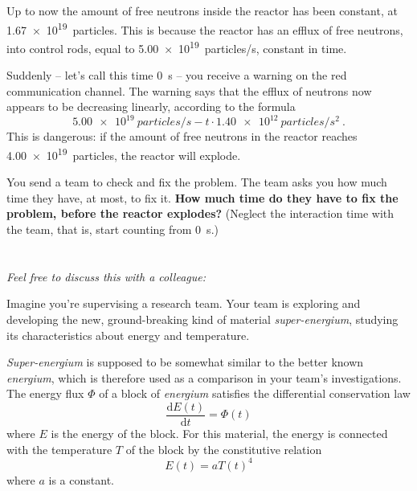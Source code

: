 \documentclass[a4paper,12pt,%
onecolumn,oneside,%
british%
]{memoir}
\newcommand*{\di}{\mathrm{d}}%
\renewcommand*{\|}[1][]{\nonscript\:#1\vert\nonscript\:\mathopen{}}
\newcommand*{\yE}{E}
\newcommand*{\yH}{\varPhi}%
\newcommand*{\yT}{T}%
\begin{document}
\begin{enumerate}[exerc]
  Up to now the amount of free neutrons inside the reactor has been constant, at \qty{1.67e19}{particles}. This is because the reactor has an efflux of free neutrons, into control rods, equal to \qty{5.00e19}{particles/s}, constant in time.

  Suddenly -- let's call this time \qty{0}{s} -- you receive a warning on the red communication channel. The warning says that the efflux of neutrons now appears to be decreasing linearly, according to the formula
  \begin{equation*}
    \qty{5.00e19}{particles/s} - t\cdot\qty{1.40e12}{particles/s^{2}} \ .
  \end{equation*}
  This is dangerous: if the amount of free neutrons in the reactor reaches \qty{4.00e19}{particles}, the reactor will explode.

  You send a team to check and fix the problem. The team asks you how much time they have, at most, to fix it. \textbf{How much time do they have to fix the problem, before the reactor explodes?} (Neglect the interaction time with the team, that is, start counting from \qty{0}{s}.)

\end{enumerate}






\section{}
\label{sec:change_bal_or_const}

\emph{Feel free to discuss this with a colleague:}

\smallskip

Imagine you're supervising a research team. Your team is exploring and developing the new, ground-breaking kind of material \emph{super-energium}, studying its characteristics about energy and temperature.

\emph{Super-energium} is supposed to be somewhat similar to the better known \emph{energium}, which is therefore used as a comparison in your team's investigations. The energy flux $\yH$ of a block of \emph{energium} satisfies the differential conservation law
\begin{equation}\label{eq:energy_block}
  \frac{\di\yE(t)}{\di t} = \yH(t)
\end{equation}
where $\yE$ is the energy of the block. For this material, the energy is connected with the temperature $\yT$ of the block by the constitutive relation
\begin{equation}\label{eq:const_block}
  \yE(t) = a \yT(t)^{4}
\end{equation}
where $a$ is a constant.
\end{document}
